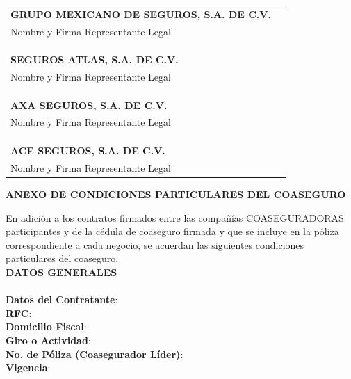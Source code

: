 \documentclass[letterpaper,10pt]{article}
\begin{document}
\begin{center}
    \begin{tabularx}{\textwidth}{Xr}
        \textbf{GRUPO MEXICANO DE SEGUROS, S.A. DE C.V.} &\\
        Nombre y Firma Representante Legal & \underline{\hspace{5cm}}\\\\\\\\
        \textbf{SEGUROS ATLAS, S.A. DE C.V.} &\\
        Nombre y Firma Representante Legal & \underline{\hspace{5cm}}\\\\\\\\
        \textbf{AXA SEGUROS, S.A. DE C.V.} &\\
        Nombre y Firma Representante Legal & \underline{\hspace{5cm}}\\\\\\\\
        \textbf{ACE SEGUROS, S.A. DE C.V.} &\\
        Nombre y Firma Representante Legal & \underline{\hspace{5cm}}
    \end{tabularx}
\end{center}
\newpage

\begin{center}
    \textbf{ANEXO DE CONDICIONES PARTICULARES DEL COASEGURO}
\end{center}

En adición a los contratos firmados entre las compañías COASEGURADORAS participantes y de la cédula de coaseguro firmada y que se incluye en la póliza correspondiente a cada negocio, se acuerdan las siguientes condiciones particulares del coaseguro.\\

\textbf{DATOS GENERALES}\\\\
\textbf{Datos del Contratante}: \underline{\hspace{5cm}}\\
\textbf{RFC}: \underline{\hspace{5cm}}\\
\textbf{Domicilio Fiscal}: \underline{\hspace{5cm}}\\
\textbf{Giro o Actividad}: \underline{\hspace{5cm}}\\
\textbf{No. de Póliza (Coasegurador Líder)}: \underline{\hspace{5cm}}\\
\textbf{Vigencia}: \underline{\hspace{5cm}}\\
\end{document}
